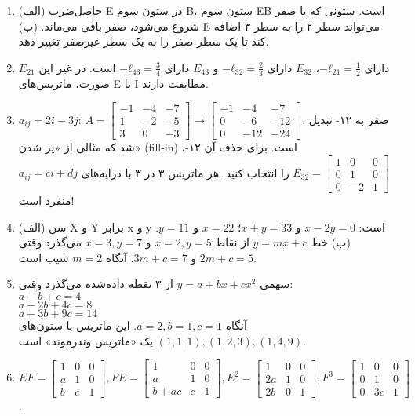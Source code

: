 \documentclass[12pt]{article}
\begin{document}
\begin{enumerate}
		\item (الف) حاصل‌ضرب E در ستون سوم B، ستون سوم EB است. ستونی که با صفر شروع می‌شود، صفر باقی می‌ماند. (ب) E می‌تواند سطر ۲ را به سطر ۳ اضافه کند تا یک سطر صفر را به یک سطر غیرصفر تغییر دهد.
		
		\item $E_{21}$ دارای $-ℓ_{21}=\frac{1}{2}$، $E_{32}$ دارای $-ℓ_{32}=\frac{2}{3}$ و $E_{43}$ دارای $-ℓ_{43}=\frac{3}{4}$ است. در غیر این صورت، ماتریس‌های E با I مطابقت دارند.
		
		\item $a_{ij}=2i−3j$: $A= \begin{bmatrix} -1 & -4 & -7 \\ 1 & -2 & -5 \\ 3 & 0 & -3 \end{bmatrix} \to \begin{bmatrix} -1 & -4 & -7 \\ 0 & -6 & -12 \\ 0 & -12 & -24 \end{bmatrix}$. صفر به ۱۲- تبدیل شد که مثالی از «پر شدن» (fill-in) است. برای حذف آن ۱۲-، $E_{32}= \begin{bmatrix} 1 & 0 & 0 \\ 0 & 1 & 0 \\ 0 & -2 & 1 \end{bmatrix}$ را انتخاب کنید. هر ماتریس ۳ در ۳ با درایه‌های $a_{ij}=ci+dj$ منفرد است!
		
		\item (الف) سن X و Y برابر x و y است: $x−2y=0$ و $x+y=33$؛ $x=22$ و $y=11$. (ب) خط $y=mx+c$ از نقاط $x=2, y=5$ و $x=3, y=7$ می‌گذرد وقتی $2m+c=5$ و $3m+c=7$. آنگاه $m=2$ شیب است.
		
		\item سهمی $y=a+bx+cx^2$ از ۳ نقطه داده‌شده می‌گذرد وقتی: \\
		$a+ b+ c= 4$ \\
		$a+2b+4c= 8$ \\
		$a+3b+9c=14$ \\
		آنگاه $a=2, b=1, c=1$. این ماتریس با ستون‌های $(1,1,1), (1,2,3), (1,4,9)$ یک «ماتریس وندرموند» است.
		
		\item $EF= \begin{bmatrix} 1 & 0 & 0 \\ a & 1 & 0 \\ b & c & 1 \end{bmatrix}, FE= \begin{bmatrix} 1 & 0 & 0 \\ a & 1 & 0 \\ b+ac & c & 1 \end{bmatrix}, E^2= \begin{bmatrix} 1 & 0 & 0 \\ 2a & 1 & 0 \\ 2b & 0 & 1 \end{bmatrix}, F^3= \begin{bmatrix} 1 & 0 & 0 \\ 0 & 1 & 0 \\ 0 & 3c & 1 \end{bmatrix}$.
		

\end{enumerate}
\end{document}

